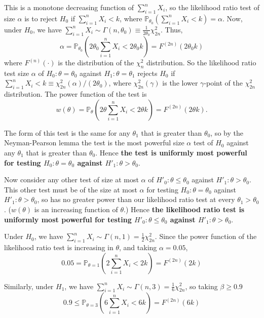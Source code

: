 This is a monotone decreasing function of $\sum^n_{i=1}X_i$, so the likelihood ratio test of size $\alpha$ is to reject $H_0$ if $\sum^n_{i=1}X_i<k$, where $\mathbb{P}_{\theta_0}\left(\sum^n_{i=1}X_i<k\right)=\alpha$. Now, under $H_0$, we have $\sum^n_{i=1}X_i\sim\Gamma(n,\theta_0)\equiv \frac{1}{2\theta_0}\chi^2_{2n}$. Thus,
\begin{equation}
\alpha = \mathbb{P}_{\theta_0}\left(2\theta_0\sum^n_{i=1}X_i<2\theta_0k\right) = F^{(2n)}(2\theta_0k)
\end{equation}
where $F^{(n)}(\cdot)$ is the distribution of the $\chi_n^2$ distribution. So the likelihood ratio test size $\alpha$ of $H_0:\theta=\theta_0$ against $H_1: \theta=\theta_1$ rejects $H_0$ if $\sum^n_{i=1}X_i<k\equiv \chi_{2n}^2(\alpha)/(2\theta_0)$, where $\chi_{2n}^2(\gamma)$ is the lower $\gamma$-point of the $\chi_{2n}^2$ distribution. The power function of the test is
\begin{equation}
w(\theta) = \mathbb{P}_{\theta}\left(2\theta\sum^n_{i=1}X_i<2\theta k\right) = F^{(2n)}(2\theta k).
\end{equation}

The form of this test is the same for any $\theta_1$ that is greater than $\theta_0$, so by the Neyman-Pearson lemma the test is the most powerful size $\alpha$ test of $H_0$ against any $\theta_1$ that is greater than $\theta_0$. Hence {\bf the test is uniformly most powerful for testing $H_0:\theta = \theta_0$ against $H'_1:\theta >\theta_0$}.

Now consider any other test of size at most $\alpha$ of $H'_0:\theta\leq \theta_0$ against $H'_1:\theta >\theta_0$. This other test must be of the size at most $\alpha$ for testing $H_0:\theta=\theta_0$ against $H'_1:\theta >\theta_0$, so has no greater power than our likelihood ratio test at every $\theta_1>\theta_0$. ($w(\theta)$ is an increasing function of $\theta$.) Hence {\bf the likelihood ratio test is uniformly most powerful for testing $H'_0:\theta\leq \theta_0$ against $H'_1:\theta >\theta_0$}.

Under $H_0$, we have $\sum^n_{i=1}X_i\sim\Gamma(n,1)=\frac{1}{2}\chi_{2n}^2$. Since the power function of the likelihood ratio test is increasing in $\theta$, and taking $\alpha=0.05$,
\begin{equation}
0.05 = \mathbb{P}_{\theta=1}\left(2\sum^n_{i=1}X_i<2k\right) = F^{(2n)}(2k)
\end{equation}

Similarly, under $H_1$, we have $\sum^n_{i=1}X_i\sim\Gamma(n,3)=\frac{1}{6}\chi_{2n}^2$, so taking $\beta\geq 0.9$
\begin{equation}
0.9 \leq \mathbb{P}_{\theta=3}\left(6\sum^n_{i=1}X_i<6k\right) = F^{(2n)}(6k)
\end{equation}

